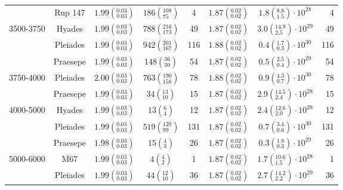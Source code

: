 \begin{tabular}{lccccccr}
          & Rup 147 &  $1.99\left(^{0.03}_{0.03}\right)$ &      $186\left(^{108}_{75}\right)$ &              4 &  $1.87\left(^{0.02}_{0.02}\right)$ &   $1.8\left(^{8.8}_{1.5}\right)\cdot 10^{28}$ &                4 \\
3500-3750 & Hyades &  $1.99\left(^{0.03}_{0.03}\right)$ &     $788\left(^{216}_{173}\right)$ &             49 &  $1.87\left(^{0.02}_{0.02}\right)$ &  $3.0\left(^{14.9}_{2.5}\right)\cdot 10^{29}$ &               49 \\
          & Pleiades &  $1.99\left(^{0.03}_{0.03}\right)$ &     $942\left(^{201}_{167}\right)$ &            116 &  $1.88\left(^{0.02}_{0.02}\right)$ &   $0.4\left(^{1.7}_{0.3}\right)\cdot 10^{30}$ &              116 \\
          & Praesepe &  $1.99\left(^{0.03}_{0.03}\right)$ &       $148\left(^{36}_{30}\right)$ &             54 &  $1.87\left(^{0.02}_{0.02}\right)$ &   $0.5\left(^{2.5}_{0.4}\right)\cdot 10^{29}$ &               54 \\
3750-4000 & Pleiades &  $2.00\left(^{0.03}_{0.03}\right)$ &     $763\left(^{190}_{158}\right)$ &             78 &  $1.88\left(^{0.02}_{0.02}\right)$ &   $0.9\left(^{4.3}_{0.7}\right)\cdot 10^{30}$ &               78 \\
          & Praesepe &  $1.99\left(^{0.03}_{0.03}\right)$ &        $34\left(^{13}_{10}\right)$ &             15 &  $1.87\left(^{0.02}_{0.02}\right)$ &  $2.9\left(^{14.5}_{2.4}\right)\cdot 10^{28}$ &               15 \\
4000-5000 & Hyades &  $1.99\left(^{0.03}_{0.03}\right)$ &          $13\left(^{6}_{4}\right)$ &             12 &  $1.87\left(^{0.02}_{0.02}\right)$ &  $2.4\left(^{12.6}_{2.0}\right)\cdot 10^{28}$ &               12 \\
          & Pleiades &  $1.99\left(^{0.03}_{0.03}\right)$ &      $519\left(^{120}_{99}\right)$ &            131 &  $1.87\left(^{0.02}_{0.02}\right)$ &   $0.7\left(^{3.4}_{0.6}\right)\cdot 10^{30}$ &              131 \\
          & Praesepe &  $1.98\left(^{0.03}_{0.03}\right)$ &          $15\left(^{4}_{3}\right)$ &             26 &  $1.87\left(^{0.02}_{0.02}\right)$ &   $0.3\left(^{1.8}_{0.3}\right)\cdot 10^{29}$ &               26 \\
5000-6000 & M67 &  $1.99\left(^{0.03}_{0.03}\right)$ &           $4\left(^{4}_{2}\right)$ &              1 &  $1.87\left(^{0.02}_{0.02}\right)$ &  $1.7\left(^{10.6}_{1.5}\right)\cdot 10^{28}$ &                1 \\
          & Pleiades &  $1.99\left(^{0.03}_{0.03}\right)$ &        $44\left(^{12}_{10}\right)$ &             36 &  $1.87\left(^{0.02}_{0.02}\right)$ &  $2.7\left(^{14.2}_{2.2}\right)\cdot 10^{29}$ &               36 \\

\end{tabular}

